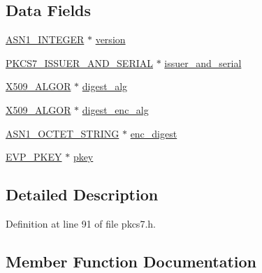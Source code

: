 \subsection*{Data Fields}
\begin{DoxyCompactItemize}
\item 
\hyperlink{crypto_2ossl__typ_8h_af4335399bf9774cb410a5e93de65998b}{A\+S\+N1\+\_\+\+I\+N\+T\+E\+G\+ER} $\ast$ \hyperlink{structpkcs7__signer__info__st_abf367aeef355b6acf5be7c569c4b28b0}{version}
\item 
\hyperlink{crypto_2pkcs7_2pkcs7_8h_a3f5400dcd95708494b81eaae75743fcf}{P\+K\+C\+S7\+\_\+\+I\+S\+S\+U\+E\+R\+\_\+\+A\+N\+D\+\_\+\+S\+E\+R\+I\+AL} $\ast$ \hyperlink{structpkcs7__signer__info__st_ac70f87eb66589d0b69550ea4e8d46c93}{issuer\+\_\+and\+\_\+serial}
\item 
\hyperlink{crypto_2ossl__typ_8h_aa2b6185e6254f36f709cd6577fb5022e}{X509\+\_\+\+A\+L\+G\+OR} $\ast$ \hyperlink{structpkcs7__signer__info__st_a0af54b3d5055c0ed89ca6de63bf3a130}{digest\+\_\+alg}
\item 
\hyperlink{crypto_2ossl__typ_8h_aa2b6185e6254f36f709cd6577fb5022e}{X509\+\_\+\+A\+L\+G\+OR} $\ast$ \hyperlink{structpkcs7__signer__info__st_a4a4e0ee9b3fba07a2d93d15eef72fedc}{digest\+\_\+enc\+\_\+alg}
\item 
\hyperlink{crypto_2ossl__typ_8h_afbd05e94e0f0430a2b729473efec88c1}{A\+S\+N1\+\_\+\+O\+C\+T\+E\+T\+\_\+\+S\+T\+R\+I\+NG} $\ast$ \hyperlink{structpkcs7__signer__info__st_ab4d14b7872c4a3dd44ba41dd7d4b7ad6}{enc\+\_\+digest}
\item 
\hyperlink{crypto_2ossl__typ_8h_a2fca4fef9e4c7a2a739b1ea04acb56ce}{E\+V\+P\+\_\+\+P\+K\+EY} $\ast$ \hyperlink{structpkcs7__signer__info__st_ad6e367842646f43c91845fb952047fe3}{pkey}
\end{DoxyCompactItemize}


\subsection{Detailed Description}


Definition at line 91 of file pkcs7.\+h.



\subsection{Member Function Documentation}
